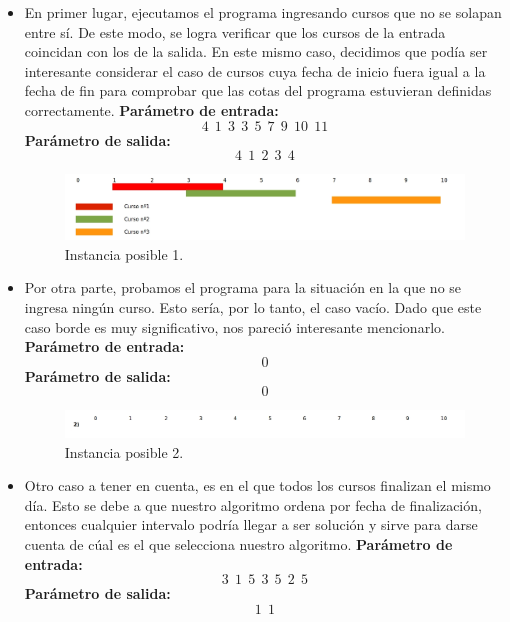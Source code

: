 \begin{itemize}
\item En primer lugar, ejecutamos el programa ingresando cursos que no se solapan entre sí. De este modo, se logra verificar que los cursos de la entrada coincidan con los de la salida. En este mismo caso, decidimos que podía ser interesante considerar el caso de cursos cuya fecha de inicio fuera igual a la fecha de fin para comprobar que las cotas del programa estuvieran definidas correctamente.\newline
\textbf{Parámetro de entrada:} $$4\ \ 1\ \ 3\ \ 3\ \ 5\ \ 7\ \ 9\ \ 10\ \ 11$$
\textbf{Parámetro de salida:} $$4\ \ 1\ \ 2\ \ 3\ \ 4$$\newline

\begin{figure}[H] %
\begin{center}
\includegraphics[width=450pt]{../imgs/instancia1.jpg}
\end{center}
\caption{Instancia posible 1.}
\end{figure}

\item Por otra parte, probamos el programa para la situación en la que no se ingresa ningún curso. Esto sería, por lo tanto, el caso vacío. Dado que este caso borde es muy significativo, nos pareció interesante mencionarlo.\newline
\textbf{Parámetro de entrada:} $$0$$
\textbf{Parámetro de salida:} $$0$$ \newline

\begin{figure}[H] %
\begin{center}
\includegraphics[width=450pt]{../imgs/instancia2.jpg}
\end{center}
\caption{Instancia posible 2.}
\end{figure}

\item Otro caso a tener en cuenta, es en el que todos los cursos finalizan el mismo día. Esto se debe a que nuestro algoritmo ordena por fecha de finalización, entonces cualquier intervalo podría llegar a ser solución y sirve para darse cuenta de cúal es el que selecciona nuestro algoritmo. \newline
\textbf{Parámetro de entrada:}  $$3\ \ 1\ \ 5\ \ 3\ \ 5\ \ 2\ \ 5$$
\textbf{Parámetro de salida:}  $$1\ \ 1$$\newline


\end{itemize}
